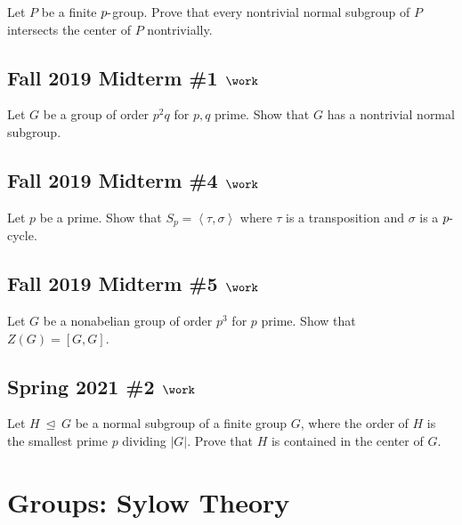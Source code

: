 Let \(P\) be a finite \(p{\hbox{-}}\)group. Prove that every nontrivial
normal subgroup of \(P\) intersects the center of \(P\) nontrivially.

\hypertarget{fall-2019-midterm-1-work}{%
\subsection{\texorpdfstring{Fall 2019 Midterm \#1
\(\work\)}{Fall 2019 Midterm \#1 \textbackslash work}}\label{fall-2019-midterm-1-work}}

Let \(G\) be a group of order \(p^2q\) for \(p, q\) prime. Show that
\(G\) has a nontrivial normal subgroup.

\hypertarget{fall-2019-midterm-4-work}{%
\subsection{\texorpdfstring{Fall 2019 Midterm \#4
\(\work\)}{Fall 2019 Midterm \#4 \textbackslash work}}\label{fall-2019-midterm-4-work}}

Let \(p\) be a prime. Show that
\(S_p = \left\langle{\tau, \sigma}\right\rangle\) where \(\tau\) is a
transposition and \(\sigma\) is a \(p{\hbox{-}}\)cycle.

\hypertarget{fall-2019-midterm-5-work}{%
\subsection{\texorpdfstring{Fall 2019 Midterm \#5
\(\work\)}{Fall 2019 Midterm \#5 \textbackslash work}}\label{fall-2019-midterm-5-work}}

Let \(G\) be a nonabelian group of order \(p^3\) for \(p\) prime. Show
that \(Z(G) = [G, G]\).

\hypertarget{spring-2021-2-work}{%
\subsection{\texorpdfstring{Spring 2021 \#2
\(\work\)}{Spring 2021 \#2 \textbackslash work}}\label{spring-2021-2-work}}

Let \(H {~\trianglelefteq~}G\) be a normal subgroup of a finite group
\(G\), where the order of \(H\) is the smallest prime \(p\) dividing
\({\left\lvert {G} \right\rvert}\). Prove that \(H\) is contained in the
center of \(G\).

\hypertarget{groups-sylow-theory}{%
\section{Groups: Sylow Theory}\label{groups-sylow-theory}}

